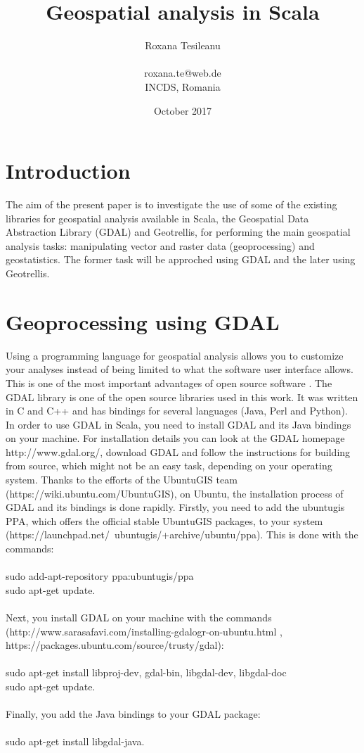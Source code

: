 \documentclass {article}
\title {Geospatial analysis in Scala}
\date {October 2017}
\author {Roxana Tesileanu \\
\\
roxana.te@web.de \\
INCDS, Romania}
\begin{document}
	\maketitle

\tableofcontents

\section {Introduction}

The aim of the present paper is to investigate the use of some of the existing libraries for geospatial analysis available in Scala, the Geospatial Data Abstraction Library (GDAL) and Geotrellis, for performing the main geospatial analysis tasks: manipulating vector and raster data (geoprocessing) and geostatistics.
The former task will be approched using GDAL and the later using Geotrellis.  

\section {Geoprocessing using GDAL}

Using a programming language for geospatial analysis allows you to customize your analyses instead of being limited to what the software user interface allows. This is one of the most important advantages of open source software \cite{garrard_geoprocessing_2016}. The GDAL library is one of the open source libraries used in this work. It was written in C and C++ and has bindings for several languages (Java, Perl and Python).     
In order to use GDAL in Scala, you need to install GDAL and its Java bindings on your machine.  
For installation details you can look at the GDAL homepage http://www.gdal.org/, download GDAL and follow the instructions for building from source, which might not be an easy task, depending on your operating system. 
Thanks to the efforts of the UbuntuGIS team (https://wiki.ubuntu.com/UbuntuGIS), on Ubuntu, the installation process of GDAL and its bindings is done rapidly. Firstly, you need to add the ubuntugis PPA, which offers the official stable UbuntuGIS packages, to your system (https://launchpad.net/~ubuntugis/+archive/ubuntu/ppa). This is done with the commands: \\
\\
sudo add-apt-repository ppa:ubuntugis/ppa \\
sudo apt-get update.\\
\\
Next, you install GDAL on your machine with the commands (http://www.sarasafavi.com/installing-gdalogr-on-ubuntu.html , https://packages.ubuntu.com/source/trusty/gdal):\\
\\
sudo apt-get install libproj-dev, gdal-bin, libgdal-dev, libgdal-doc \\
sudo apt-get update.\\
\\
Finally, you add the Java bindings to your GDAL package:\\
\\
sudo apt-get install libgdal-java.    \\
\\
\end{document}
